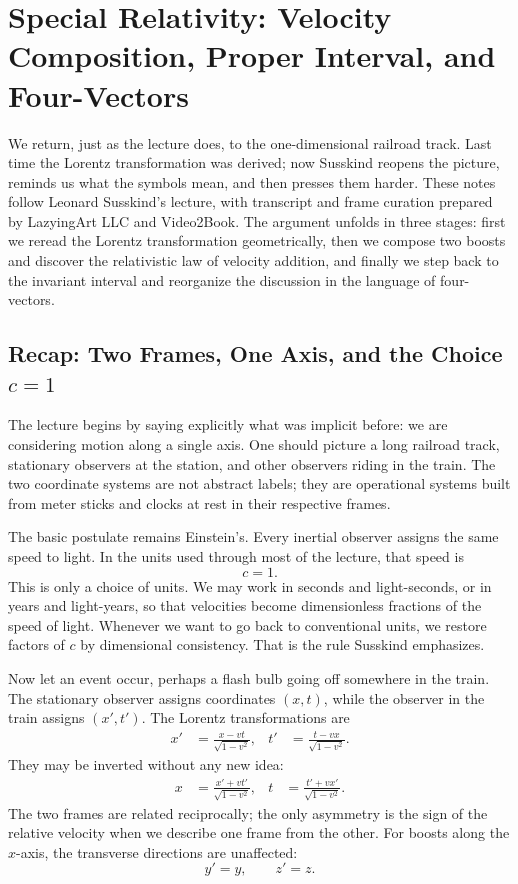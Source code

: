 \chapter{Special Relativity: Velocity Composition, Proper Interval, and Four-Vectors}

We return, just as the lecture does, to the one-dimensional railroad track. Last time the Lorentz transformation was derived; now Susskind reopens the picture, reminds us what the symbols mean, and then presses them harder. These notes follow Leonard Susskind's lecture, with transcript and frame curation prepared by LazyingArt LLC and Video2Book. The argument unfolds in three stages: first we reread the Lorentz transformation geometrically, then we compose two boosts and discover the relativistic law of velocity addition, and finally we step back to the invariant interval and reorganize the discussion in the language of four-vectors.

\section{Recap: Two Frames, One Axis, and the Choice \(c=1\)}

The lecture begins by saying explicitly what was implicit before: we are considering motion along a single axis. One should picture a long railroad track, stationary observers at the station, and other observers riding in the train. The two coordinate systems are not abstract labels; they are operational systems built from meter sticks and clocks at rest in their respective frames.

The basic postulate remains Einstein's. Every inertial observer assigns the same speed to light. In the units used through most of the lecture, that speed is
\begin{equation}
c=1.
\end{equation}
This is only a choice of units. We may work in seconds and light-seconds, or in years and light-years, so that velocities become dimensionless fractions of the speed of light. Whenever we want to go back to conventional units, we restore factors of \(c\) by dimensional consistency. That is the rule Susskind emphasizes.

Now let an event occur, perhaps a flash bulb going off somewhere in the train. The stationary observer assigns coordinates \((x,t)\), while the observer in the train assigns \((x',t')\). The Lorentz transformations are
\begin{align}
x' &= \frac{x-vt}{\sqrt{1-v^2}},
&
t' &= \frac{t-vx}{\sqrt{1-v^2}}.
\end{align}
They may be inverted without any new idea:
\begin{align}
x &= \frac{x'+vt'}{\sqrt{1-v^2}},
&
t &= \frac{t'+vx'}{\sqrt{1-v^2}}.
\end{align}
The two frames are related reciprocally; the only asymmetry is the sign of the relative velocity when we describe one frame from the other. For boosts along the \(x\)-axis, the transverse directions are unaffected:
\begin{equation}
y'=y,
\qquad
z'=z.
\end{equation}

